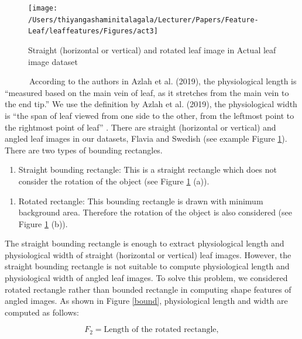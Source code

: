 \documentclass{article}
\begin{document}
\begin{figure}[!ht]

{\centering \texttt{[image: /Users/thiyangashaminitalagala/Lecturer/Papers/Feature-Leaf/leaffeatures/Figures/act3]} 

}

\caption{\label{act3}Straight (horizontal or vertical) and rotated leaf image in Actual leaf image dataset}\label{fig:act3}
\end{figure}

~~~~~~According to the authors in Azlah et al. (2019), the physiological
length is ``measured based on the main vein of leaf, as it stretches
from the main vein to the end tip.'' We use the definition by Azlah et
al. (2019), the physiological width is ``the span of leaf viewed from
one side to the other, from the leftmost point to the rightmost point of
leaf'' . There are straight (horizontal or vertical) and angled leaf
images in our datasets, Flavia and Swedish (see example Figure
\ref{fig:act3}). There are two types of bounding rectangles.

\begin{enumerate}
\def\labelenumi{\roman{enumi})}
\tightlist
\item
  Straight bounding rectangle: This is a straight rectangle which does
  not consider the rotation of the object (see Figure \ref{fig:act3}
  (a)).
\end{enumerate}

\begin{enumerate}
\def\labelenumi{\roman{enumi})}
\setcounter{enumi}{1}
\tightlist
\item
  Rotated rectangle: This bounding rectangle is drawn with minimum
  background area. Therefore the rotation of the object is also
  considered (see Figure \ref{fig:act3} (b)).
\end{enumerate}

The straight bounding rectangle is enough to extract physiological
length and physiological width of straight (horizontal or vertical) leaf
images. However, the straight bounding rectangle is not suitable to
compute physiological length and physiological width of angled leaf
images. To solve this problem, we considered rotated rectangle rather
than bounded rectangle in computing shape features of angled images. As
shown in Figure \ref{bound}, physiological length and width are computed
as follows:

\begin{equation}
   F_2 = \text{Length of the rotated rectangle},
\label{equa_F2}
\end{equation}
\end{document}
